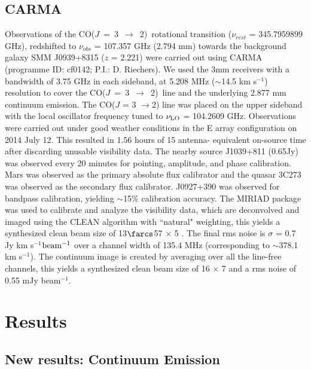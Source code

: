 \documentclass{emulateapj}
\newcommand{\rarr}{$\rightarrow$}
\newcommand{\CO}{\mbox{CO($J$ = 3 $\rightarrow$ 2) }}
\newcommand{\pmOne}{$^{-1}$}
\begin{document}
\subsection{CARMA} \label{sec:carmadata}
Observations of the \CO rotational transition ($\nu_{rest}$ = 345.7959899 GHz),
redshifted to $\nu_{obs}$ = 107.357 GHz (2.794 mm) towards the background galaxy SMM
J0939+8315 ($z$ = 2.221) were carried out using CARMA (programme ID: cf0142; P.I.: D. Riechers).
We used the 3mm receivers with a bandwidth of 3.75 GHz in each sideband, at 5.208 MHz ($\sim$14.5 km s\pmOne)
resolution to cover the \CO line and the underlying 2.877 mm continuum emission. The CO($J$ = 3 
\rarr 2) line was placed on the
upper sideband with the local oscillator frequency tuned to $\nu_{\rm LO}$ = 104.2609 GHz.
Observations were carried out under good
weather conditions in the E array configuration on 2014 July 12. This resulted in 1.56 hours of 15 antenna-
equivalent on-source time after discarding unusable visibility data.
The nearby source J1039+811 (0.65Jy) was observed every 20 minutes for
pointing, amplitude, and phase calibration. Mars was observed as the primary
absolute flux calibrator and the quasar 3C273 was observed as the secondary
flux calibrator. J0927+390 was observed for bandpass calibration, yielding $\sim
$15\% calibration accuracy.
The {\sc MIRIAD} package was used to calibrate and analyze the visibility data, which are deconvolved and imaged using
the CLEAN algorithm with ``natural" weighting, this yields a synthesized clean beam size of 13$\farcs$57 $\times$ 
5 . The final rms noise is $\sigma$ = 0.7 Jy km s\pmOne $\rm beam^{-1}$ over
a channel width of 135.4 MHz (corresponding to $\sim$378.1 km s\pmOne). The continuum image is created by
averaging over all the line-free channels, this yields a synthesized clean beam size of 16 $\times$ 7 and a 
rms noise of 0.55 mJy beam\pmOne.

\section{Results}\label{sec:res}
\subsection{New results: Continuum Emission} 
\end{document}
